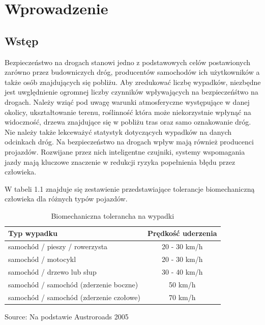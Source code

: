 \chapter{Wprowadzenie}
\label{cha:wprowadzenie}


\section{Wstęp}
\label{sec:wstep}

Bezpieczeństwo na drogach stanowi jedno z podstawowych celów postawionych zarówno przez budowniczych dróg, producentów samochodów ich użytkowników a także osób znajdujących się pobliżu. Aby zredukować liczbę wypadków, niezbędne jest uwględnienie ogromnej liczby czynników wpływających na bezpieczeńśtwo na drogach. Należy wziąć pod uwagę warunki atmosferyczne występujące w danej okolicy, ukształtowanie terenu, roślinność która może niekorzystnie wpłynąć na widoczność, drzewa znajdujące się w pobliżu tras oraz samo oznakowanie dróg. Nie należy także lekceważyć statystyk dotyczących wypadków na danych odcinkach dróg. Na bezpieczeństwo na drogach wpływ mają również producenci projazdów. Rozwijane przez nich inteligentne czujniki, systemy wspomagania jazdy mają kluczowe znaczenie w redukcji ryzyka popełnienia błędu przez człowieka.

W tabeli 1.1 znajduje się zestawienie przedstawiające tolerancje biomechaniczną człowieka dla różnych typów pojazdów.

\newcommand{\source}[1]{\caption*{Source: {#1}} }

\begin{table}[ht]
\centering
\caption{Biomechaniczna tolerancha na wypadki}
\label{my-label}
\begin{tabular}{| l | c |}
\hline
\textbf{Typ wypadku}                    & \textbf{Prędkość uderzenia} \\ \hline
samochód / pieszy / rowerzysta          & 20 - 30 km/h                                    \\ \hline
samochód / motocykl                     & 20 - 30 km/h                                    \\ \hline
samochód / drzewo lub słup              & 30 - 40 km/h                                    \\ \hline
samochód / samochód (zderzenie boczne)  & 50 km/h                                         \\ \hline
samochód / samochód (zderzenie czołowe) & 70 km/h   \\ \hline
\end{tabular}
\source{Na podstawie Austroroads 2005}
\end{table}


